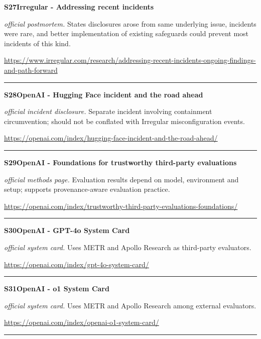 \hypertarget{src:S27}{}\noindent\textbf{S27}\quad \textbf{Irregular - Addressing recent incidents}\hfill{}\par
\smallskip
\noindent\textit{official postmortem.} States disclosures arose from same underlying issue, incidents were rare, and better implementation of existing safeguards could prevent most incidents of this kind.\par
\noindent\url{https://www.irregular.com/research/addressing-recent-incidents-ongoing-findings-and-path-forward}\par
\medskip\hrule\medskip

\hypertarget{src:S28}{}\noindent\textbf{S28}\quad \textbf{OpenAI - Hugging Face incident and the road ahead}\hfill{}\par
\smallskip
\noindent\textit{official incident disclosure.} Separate incident involving containment circumvention; should not be conflated with Irregular misconfiguration events.\par
\noindent\url{https://openai.com/index/hugging-face-incident-and-the-road-ahead/}\par
\medskip\hrule\medskip

\hypertarget{src:S29}{}\noindent\textbf{S29}\quad \textbf{OpenAI - Foundations for trustworthy third-party evaluations}\hfill{}\par
\smallskip
\noindent\textit{official methods page.} Evaluation results depend on model, environment and setup; supports provenance-aware evaluation practice.\par
\noindent\url{https://openai.com/index/trustworthy-third-party-evaluations-foundations/}\par
\medskip\hrule\medskip

\hypertarget{src:S30}{}\noindent\textbf{S30}\quad \textbf{OpenAI - GPT-4o System Card}\hfill{}\par
\smallskip
\noindent\textit{official system card.} Uses METR and Apollo Research as third-party evaluators.\par
\noindent\url{https://openai.com/index/gpt-4o-system-card/}\par
\medskip\hrule\medskip

\hypertarget{src:S31}{}\noindent\textbf{S31}\quad \textbf{OpenAI - o1 System Card}\hfill{}\par
\smallskip
\noindent\textit{official system card.} Uses METR and Apollo Research among external evaluators.\par
\noindent\url{https://openai.com/index/openai-o1-system-card/}\par
\medskip\hrule\medskip

